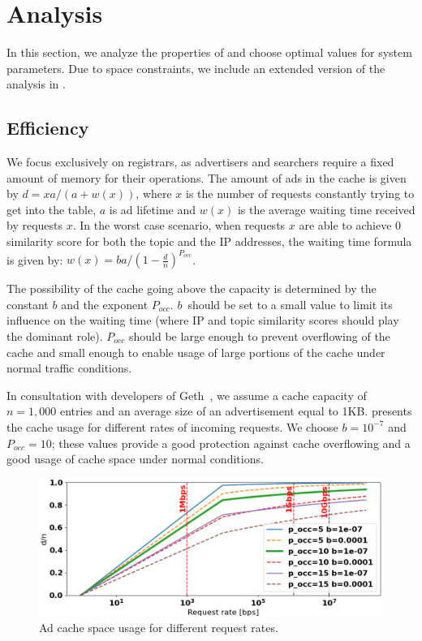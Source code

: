 
\section{Analysis}
\label{sec:analysis}

In this section, we analyze the properties of \sysname and choose optimal values for system parameters. 
Due to space constraints, we include an extended version of the analysis in .

\subsection{Efficiency}

We focus exclusively on registrars, as advertisers and searchers require a fixed amount of memory for their operations. The amount of ads in the cache is given by $d = xa/(a + w(x))$, where $x$ is the number of requests constantly trying to get into the table, $a$ is ad lifetime and $w(x)$ is the average waiting time received by requests $x$.
In the worst case scenario, when requests $x$ are able to achieve 0 similarity score for both the topic and the IP addresses, the waiting time formula is given by: $w(x) = ba/(1 - \frac{d}{n})^{P_\textit{occ}}$.

The possibility of the cache going above the capacity is determined by the constant $b$ and the exponent $P_\textit{occ}$. $b$~should be set to a small value to limit its influence on the waiting time (where IP and topic similarity scores should play the dominant role). $P_\textit{occ}$ should be large enough to prevent overflowing of the cache and small enough to enable usage of large portions of the cache under normal traffic conditions. 

In consultation with developers of Geth~\cite{geth}, we assume a cache capacity of $n = 1,000$ entries and an average size of an advertisement equal to 1KB.
 presents the cache usage for different rates of incoming requests.
We choose $b=10^{-7}$ and $P_\textit{occ}=10$; these values provide a good protection against cache overflowing and a good usage of cache space under normal conditions. 

\begin{figure}[t]
    \includegraphics[width=1\linewidth]{img/cache_size_limit}
    \vspace{-0.10in}
    \caption{Ad cache space usage for different request rates.
    }
    \label{fig:cache_size_limit}
    \vspace{-0.15in}
\end{figure}

